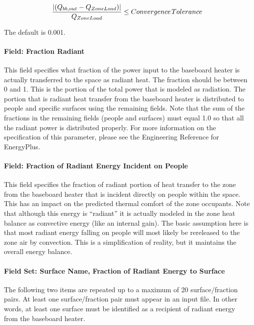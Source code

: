 \begin{equation}
\frac{{\left| {({Q_{bb,out}} - {Q_{ZoneLoad}})} \right|}}{{{Q_{ZoneLoad}}}} \le Convergence{\kern 1pt} Tolerance
\end{equation}

The default is 0.001.

\paragraph{Field: Fraction Radiant}\label{field-fraction-radiant-000}

This field specifies what fraction of the power input to the baseboard heater is actually transferred to the space as radiant heat. The fraction should be between 0 and 1. This is the portion of the total power that is modeled as radiation. The portion that is radiant heat transfer from the baseboard heater is distributed to people and specific surfaces using the remaining fields. Note that the sum of the fractions in the remaining fields (people and surfaces) must equal 1.0 so that all the radiant power is distributed properly. For more information on the specification of this parameter, please see the Engineering Reference for EnergyPlus.

\paragraph{Field: Fraction of Radiant Energy Incident on People}\label{field-fraction-of-radiant-energy-incident-on-people}

This field specifies the fraction of radiant portion of heat transfer to the zone from the baseboard heater that is incident directly on people within the space. This has an impact on the predicted thermal comfort of the zone occupants. Note that although this energy is ``radiant'' it is actually modeled in the zone heat balance as convective energy (like an internal gain). The basic assumption here is that most radiant energy falling on people will most likely be rereleased to the zone air by convection. This is a simplification of reality, but it maintains the overall energy balance.

\paragraph{Field Set: Surface Name, Fraction of Radiant Energy to Surface}\label{field-set-surface-name-fraction-of-radiant-energy-to-surface}

The following two items are repeated up to a maximum of 20 surface/fraction pairs. At least one surface/fraction pair must appear in an input file. In other words, at least one surface must be identified as a recipient of radiant energy from the baseboard heater.

